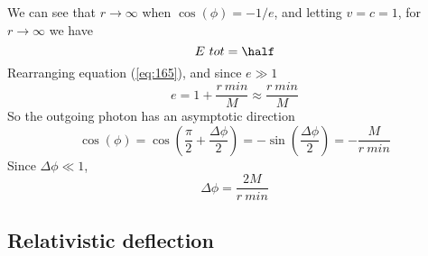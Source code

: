 We can see that $r \to \infty$ when $\cos(\phi) = -1/e$, and letting
$v=c=1$, for $r \to \infty$ we have
\begin{equation}
  \label{eq:166}
  E~{tot} = \half
\end{equation}
Rearranging equation (\ref{eq:165}), and since $e\gg 1$
\begin{equation}
  \label{eq:167}
  e = 1 + \frac{r~{min}}{M} \approx \frac{r~{min}}{M}
\end{equation}
So the outgoing photon has an asymptotic direction
\begin{equation}
  \label{eq:168}
  \cos(\phi) = \cos( \frac{\pi}{2} + \frac{\Delta \phi}{2} ) = - \sin( \frac{\Delta \phi}{2}) = - \frac{M}{r~{min}}
\end{equation}
Since $\Delta \phi \ll 1$,
\begin{equation}
  \label{eq:169}
  \Delta \phi = \frac{2M}{r~{min}}
\end{equation}

\subsection{Relativistic deflection}
\label{sec:relat-defl}

